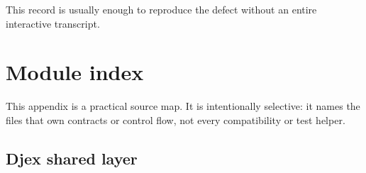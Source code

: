 \documentclass[10pt,letterpaper,oneside]{report}
\begin{document}
This record is usually enough to reproduce the defect without an entire interactive transcript.

\appendix

\chapter{Module index}\label{app:module-index}

This appendix is a practical source map. It is intentionally selective: it names the files that own contracts or control flow, not every compatibility or test helper.

\section{Djex shared layer}
\end{document}

